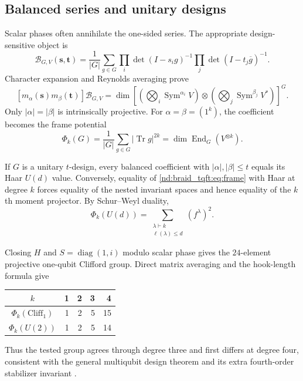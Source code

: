 \documentclass[10pt]{article}
\newcommand{\Sym}{\operatorname{Sym}}
\newcommand{\Tr}{\operatorname{Tr}}
\newcommand{\BMGF}{\mathcal B}
\begin{document}
\subsection{Balanced series and unitary designs}

Scalar phases often annihilate the one-sided series.  The appropriate
design-sensitive object is
\begin{equation}\label{nd:braid_tqft:eq:balanced}
\BMGF_{G,V}(\mathbf s,\mathbf t)=\frac1{|G|}\sum_{g\in G}
\prod_i\det(I-s_ig)^{-1}\prod_j\det(I-t_j\overline g)^{-1}.
\end{equation}
Character expansion and Reynolds averaging prove
\begin{equation}\label{nd:braid_tqft:eq:balanced-coeff}
[m_\alpha(\mathbf s)m_\beta(\mathbf t)]\BMGF_{G,V}
=\dim\left[
\left(\bigotimes_i\Sym^{\alpha_i}V\right)\otimes
\left(\bigotimes_j\Sym^{\beta_j}V^*\right)
\right]^G.
\end{equation}
Only $|\alpha|=|\beta|$ is intrinsically projective.  For
$\alpha=\beta=(1^k)$, the coefficient becomes the frame potential
\begin{equation}\label{nd:braid_tqft:eq:frame}
\Phi_k(G)=\frac1{|G|}\sum_{g\in G}|\Tr g|^{2k}
=\dim\operatorname{End}_G(V^{\otimes k}).
\end{equation}

If $G$ is a unitary $t$-design, every balanced coefficient with
$|\alpha|,|\beta|\leq t$ equals its Haar $U(d)$ value.  Conversely, equality
of \eqref{nd:braid_tqft:eq:frame} with Haar at degree $k$ forces equality of the nested
invariant spaces and hence equality of the $k$th moment projector.  By
Schur--Weyl duality,
\[
\Phi_k(U(d))=\sum_{\substack{\lambda\vdash k\\\ell(\lambda)\leq d}}
(f^\lambda)^2.
\]

Closing $H$ and $S=\operatorname{diag}(1,i)$ modulo scalar phase gives the
$24$-element projective one-qubit Clifford group.  Direct matrix averaging
and the hook-length formula give
\begin{center}
\begin{tabular}{@{}crrrr@{}}
\toprule
$k$&1&2&3&4\\
\midrule
$\Phi_k(\mathrm{Cliff}_1)$&1&2&5&15\\
$\Phi_k(U(2))$&1&2&5&14\\
\bottomrule
\end{tabular}
\end{center}
Thus the tested group agrees through degree three and first differs at degree
four, consistent with the general multiqubit design theorem and its extra
fourth-order stabilizer invariant \cite{nd:braid_tqft:clifford4}.
\end{document}
